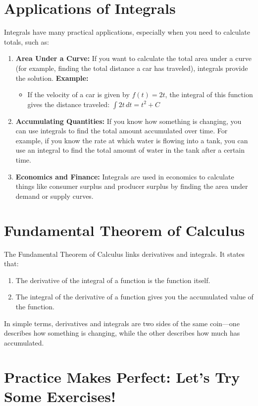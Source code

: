 \section{Applications of Integrals}
Integrals have many practical applications, especially when you need to calculate totals, such as:
\begin{enumerate}
    \item \textbf{Area Under a Curve:} If you want to calculate the total area under a curve (for example, finding the total distance a car has traveled), integrals provide the solution.
    \textbf{Example:}
    \begin{itemize}
        \item If the velocity of a car is given by \( f(t) = 2t \), the integral of this function gives the distance traveled: \( \int 2t \, dt = t^2 + C \)
    \end{itemize}
    \item \textbf{Accumulating Quantities:} If you know how something is changing, you can use integrals to find the total amount accumulated over time. For example, if you know the rate at which water is flowing into a tank, you can use an integral to find the total amount of water in the tank after a certain time.
    \item \textbf{Economics and Finance:} Integrals are used in economics to calculate things like consumer surplus and producer surplus by finding the area under demand or supply curves.
\end{enumerate}

\section{Fundamental Theorem of Calculus}
The Fundamental Theorem of Calculus links derivatives and integrals. It states that:
\begin{enumerate}
    \item The derivative of the integral of a function is the function itself.
    \item The integral of the derivative of a function gives you the accumulated value of the function.
\end{enumerate}
In simple terms, derivatives and integrals are two sides of the same coin—one describes how something is changing, while the other describes how much has accumulated.

\section{Practice Makes Perfect: Let’s Try Some Exercises!}

